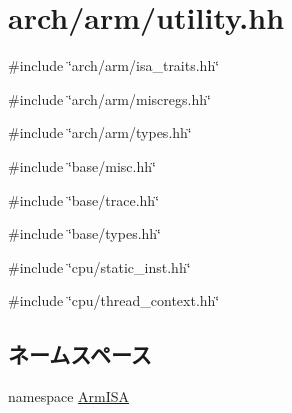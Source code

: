 \hypertarget{arm_2utility_8hh}{
\section{arch/arm/utility.hh}
\label{arm_2utility_8hh}
}
{\ttfamily \#include \char`\"{}arch/arm/isa\_\-traits.hh\char`\"{}}\par
{\ttfamily \#include \char`\"{}arch/arm/miscregs.hh\char`\"{}}\par
{\ttfamily \#include \char`\"{}arch/arm/types.hh\char`\"{}}\par
{\ttfamily \#include \char`\"{}base/misc.hh\char`\"{}}\par
{\ttfamily \#include \char`\"{}base/trace.hh\char`\"{}}\par
{\ttfamily \#include \char`\"{}base/types.hh\char`\"{}}\par
{\ttfamily \#include \char`\"{}cpu/static\_\-inst.hh\char`\"{}}\par
{\ttfamily \#include \char`\"{}cpu/thread\_\-context.hh\char`\"{}}\par
\subsection*{ネームスペース}
\begin{DoxyCompactItemize}
\item 
namespace \hyperlink{namespaceArmISA}{ArmISA}
\end{DoxyCompactItemize}
